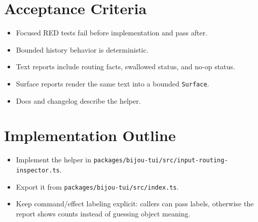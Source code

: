 \section{Acceptance Criteria}\label{record-123-acceptance-criteria}

\begin{itemize}
\tightlist
\item
  Focused RED tests fail before implementation and pass after.
\item
  Bounded history behavior is deterministic.
\item
  Text reports include routing facts, swallowed status, and no-op status.
\item
  Surface reports render the same text into a bounded \texttt{S\allowbreak{}u\allowbreak{}r\allowbreak{}f\allowbreak{}a\allowbreak{}c\allowbreak{}e}.
\item
  Docs and changelog describe the helper.
\end{itemize}

\section{Implementation Outline}\label{record-123-implementation-outline}

\begin{itemize}
\tightlist
\item
  Implement the helper in \texttt{p\allowbreak{}a\allowbreak{}c\allowbreak{}k\allowbreak{}a\allowbreak{}g\allowbreak{}e\allowbreak{}s\allowbreak{}/\allowbreak{}b\allowbreak{}i\allowbreak{}j\allowbreak{}o\allowbreak{}u\allowbreak{}-\allowbreak{}t\allowbreak{}u\allowbreak{}i\allowbreak{}/\allowbreak{}s\allowbreak{}r\allowbreak{}c\allowbreak{}/\allowbreak{}i\allowbreak{}n\allowbreak{}p\allowbreak{}u\allowbreak{}t\allowbreak{}-\allowbreak{}r\allowbreak{}o\allowbreak{}u\allowbreak{}t\allowbreak{}i\allowbreak{}n\allowbreak{}g\allowbreak{}-\allowbreak{}i\allowbreak{}n\allowbreak{}s\allowbreak{}p\allowbreak{}e\allowbreak{}c\allowbreak{}t\allowbreak{}o\allowbreak{}r\allowbreak{}.\allowbreak{}t\allowbreak{}s}.
\item
  Export it from \texttt{p\allowbreak{}a\allowbreak{}c\allowbreak{}k\allowbreak{}a\allowbreak{}g\allowbreak{}e\allowbreak{}s\allowbreak{}/\allowbreak{}b\allowbreak{}i\allowbreak{}j\allowbreak{}o\allowbreak{}u\allowbreak{}-\allowbreak{}t\allowbreak{}u\allowbreak{}i\allowbreak{}/\allowbreak{}s\allowbreak{}r\allowbreak{}c\allowbreak{}/\allowbreak{}i\allowbreak{}n\allowbreak{}d\allowbreak{}e\allowbreak{}x\allowbreak{}.\allowbreak{}t\allowbreak{}s}.
\item
  Keep command/effect labeling explicit: callers can pass labels, otherwise the report shows counts instead of guessing object meaning.
\end{itemize}

